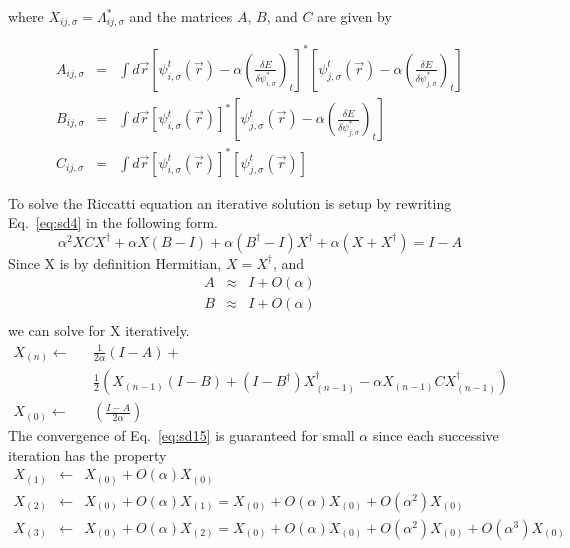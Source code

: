 \noindent
where $X_{ij,\sigma}=\Lambda_{ij,\sigma}^{*}$ and the matrices 
$A$, $B$, and $C$ are given by

\begin{eqnarray}
A_{ij,\sigma} &=& \int d\vec{r} 
             \left[\psi_{i,\sigma}^{t}(\vec{r}) 
                   - \alpha 
                     \left( \frac{\delta E}{\delta \psi_{i,\sigma}^{*}} 
                     \right)_t
             \right]^{*} 
             \left[\psi_{j,\sigma}^{t}(\vec{r}) 
                   - \alpha 
                     \left( \frac{\delta E}{\delta \psi_{j,\sigma}^{*}}
                     \right)_t
             \right] \\
B_{ij,\sigma} &=& \int d\vec{r} 
             \left[\psi_{i,\sigma}^{t}(\vec{r}) 
             \right]^{*} 
             \left[\psi_{j,\sigma}^{t}(\vec{r}) 
                   - \alpha 
                     \left( \frac{\delta E}{\delta \psi_{j,\sigma}^{*}}
                     \right)_t
             \right] \\
C_{ij,\sigma} &=& \int d\vec{r} 
             \left[\psi_{i,\sigma}^{t}(\vec{r}) 
             \right]^{*} 
             \left[\psi_{j,\sigma}^{t}(\vec{r}) 
             \right]
\end{eqnarray}

\noindent
To solve the Riccatti equation an iterative solution is setup by rewriting
Eq.~\ref{eq:sd4} in the following form.
\begin{equation}
\alpha^2 XCX^{\dag} + \alpha X(B-I) + \alpha (B^{\dag}-I)X^{\dag} 
 + \alpha(X + X^{\dag}) = I-A
\end{equation}
Since X is by definition Hermitian, $X=X^{\dag}$, and 
\begin{eqnarray}
A  &\approx& I + O(\alpha) \nonumber \\
B  &\approx& I + O(\alpha)  \\
\end{eqnarray}
we can solve for X iteratively.
\begin{eqnarray}
\label{eq:sd15}
X_{(n)} \leftarrow && \frac{1}{2 \alpha}(I-A) + \nonumber \\
                   && \frac{1}{2} \left( X_{(n-1)}(I-B)
                    + (I-B^{\dag})X_{(n-1)}^{\dag}
                    - \alpha X_{(n-1)}CX_{(n-1)}^{\dag} \right)  \\
\label{eq:sd16}
X_{(0)} \leftarrow && \left(\frac{I-A}{2 \alpha}\right)
\end{eqnarray}
The convergence of Eq.~\ref{eq:sd15} is guaranteed for small $\alpha$
since each successive iteration has the property
\begin{eqnarray}
X_{(1)} &\leftarrow& X_{(0)} + O(\alpha)X_{(0)} \nonumber \\
X_{(2)} &\leftarrow& X_{(0)} + O(\alpha) X_{(1)} 
        = X_{(0)} + O(\alpha)X_{(0)} + O(\alpha^2)X_{(0)} \nonumber \\
X_{(3)} &\leftarrow& X_{(0)} + O(\alpha) X_{(2)} 
        = X_{(0)} + O(\alpha)   X_{(0)} 
                  + O(\alpha^2) X_{(0)} 
                  + O(\alpha^3) X_{(0)} \nonumber
\end{eqnarray}


